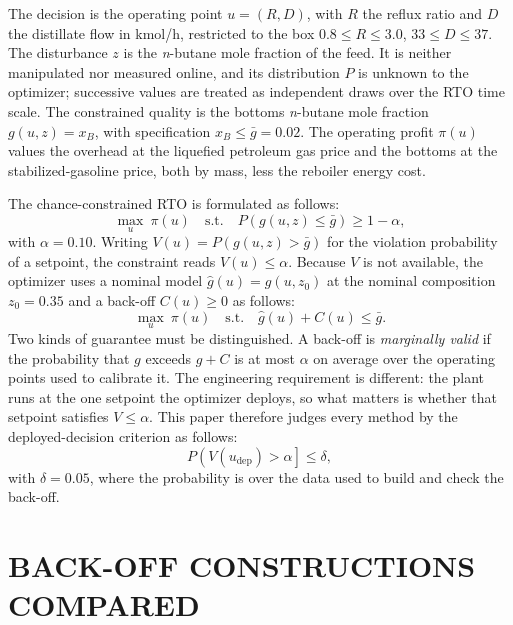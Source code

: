 \documentclass[12pt]{article}
\begin{document}
The decision is the operating point $u=(R,D)$, with $R$ the reflux ratio and $D$ the distillate
flow in kmol/h, restricted to the box $0.8 \le R \le 3.0$, $33 \le D \le 37$. The disturbance $z$
is the \textit{n}-butane mole fraction of the feed. It is neither manipulated nor measured online, and its
distribution $P$ is unknown to the optimizer; successive values are treated as independent draws
over the RTO time scale. The constrained quality is the bottoms \textit{n}-butane mole fraction
$g(u,z)=x_B$, with specification $x_B \le \bar g = 0.02$. The operating profit $\pi(u)$ values the
overhead at the liquefied petroleum gas price and the bottoms at the stabilized-gasoline price, both
by mass, less the reboiler energy cost.

The chance-constrained RTO is formulated as follows:
\begin{equation}
\max_{u}\ \pi(u) \quad \text{s.t.} \quad P\!\left(g(u,z) \le \bar g\right) \ge 1-\alpha ,
\label{eq:cc}
\end{equation}
with $\alpha = 0.10$. Writing $V(u) = P(g(u,z) > \bar g)$ for the violation probability of a
setpoint, the constraint reads $V(u) \le \alpha$. Because $V$ is not available, the optimizer uses
a nominal model $\hat g(u) = g(u, z_0)$ at the nominal composition $z_0=0.35$ and a back-off
$C(u) \ge 0$ as follows:
\begin{equation}
\max_{u}\ \pi(u) \quad \text{s.t.} \quad \hat g(u) + C(u) \le \bar g .
\label{eq:backoff}
\end{equation}
Two kinds of guarantee must be distinguished. A back-off is \emph{marginally valid} if the
probability that $g$ exceeds $\hat g + C$ is at most $\alpha$ on average over the operating points
used to calibrate it. The engineering requirement is different: the plant runs at the one setpoint
the optimizer deploys, so what matters is whether that setpoint satisfies $V \le \alpha$. This
paper therefore judges every method by the deployed-decision criterion as follows:
\begin{equation}
P\!\left(V(u_{\mathrm{dep}}) > \alpha\right] \le \delta ,
\label{eq:pac}
\end{equation}
with $\delta=0.05$, where the probability is over the data used to build and check the back-off.

\section{BACK-OFF CONSTRUCTIONS COMPARED}
\end{document}
